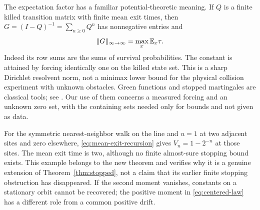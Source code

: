 The expectation factor has a familiar potential-theoretic meaning. If
$Q$ is a finite killed transition matrix with finite mean exit times,
then $G=(I-Q)^{-1}=\sum_{n\ge0}Q^n$ has nonnegative entries and
\begin{equation}\label{eq:green-norm}
             \|G\|_{\infty\to\infty}=\max_x\mathbb E_x\tau.
\end{equation}
Indeed its row sums are the sums of survival probabilities. The constant
is attained by forcing identically one on the killed state set. This is
a sharp Dirichlet resolvent norm, not a minimax lower bound for the
physical collision experiment with unknown obstacles. Green functions
and stopped martingales are classical tools; see \cite{LawlerLimic}.
Our use of them concerns a measured forcing and an unknown zero set,
with the containing sets needed only for bounds and not given as data.

For the symmetric nearest-neighbor walk on the line and $u=1$ at two
adjacent sites and zero elsewhere, \eqref{eq:mean-exit-recursion} gives
$V_n=1-2^{-n}$ at those sites. The mean exit time is two, although no
finite almost-sure stopping bound exists. This example belongs to the
new theorem and verifies why it is a genuine extension of
Theorem~\ref{thm:stopped}, not a claim that its earlier finite stopping
obstruction has disappeared. If the second moment vanishes, constants
on a stationary orbit cannot be recovered; the positive moment in
\eqref{eq:centered-law} has a different role from a common positive drift.
